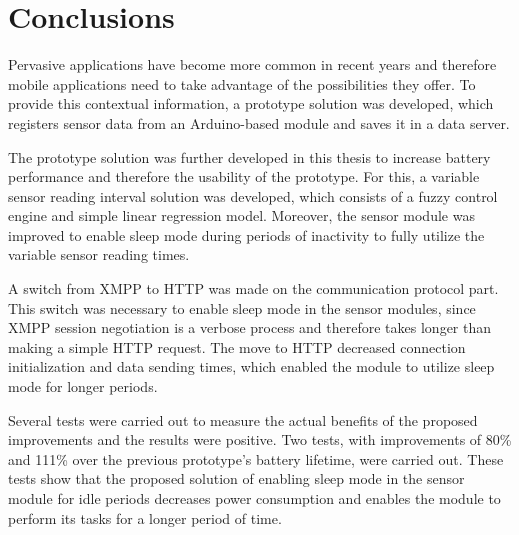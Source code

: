 
\chapter{Conclusions} %

Pervasive applications have become more common in recent years and therefore mobile applications need to take advantage of the possibilities they offer. To provide this contextual information, a prototype solution was developed, which registers sensor data from an Arduino-based module and saves it in a data server.

The prototype solution was further developed in this thesis to increase battery performance and therefore the usability of the prototype. For this, a variable sensor reading interval solution was developed, which consists of a fuzzy control engine and simple linear regression model. Moreover, the sensor module was improved to enable sleep mode during periods of inactivity to fully utilize the variable sensor reading times.

A switch from XMPP to HTTP was made on the communication protocol part. This switch was necessary to enable sleep mode in the sensor modules, since XMPP session negotiation is a verbose process and therefore takes longer than making a simple HTTP request. The move to HTTP decreased connection initialization and data sending times, which enabled the module to utilize sleep mode for longer periods.

Several tests were carried out to measure the actual benefits of the proposed improvements and the results were positive. Two tests, with improvements of 80\% and 111\% over the previous prototype's battery lifetime, were carried out. These tests show that the proposed solution of enabling sleep mode in the sensor module for idle periods decreases power consumption and enables the module to perform its tasks for a longer period of time.
 

\ifpdf
    \graphicspath{{X/figures/PNG/}{X/figures/PDF/}{X/figures/}}
\else
    \graphicspath{{X/figures/EPS/}{X/figures/}}
\fi



